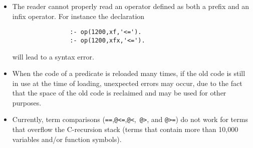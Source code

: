 \begin{itemize}
%
\item The reader cannot properly read an operator defined as both a
      prefix and an infix operator.  For instance the declaration 
      \begin{verbatim}
                :- op(1200,xf,'<=').
                :- op(1200,xfx,'<=').
      \end{verbatim}
      will lead to a syntax error.
%
\item When the code of a predicate is reloaded many times, if the old 
      code is still in use at the time of loading, unexpected errors may 
      occur, due to the fact that the space of the old code is reclaimed
      and may be used for other purposes.
\item Currently, term comparisons ({\tt ==},{\tt @<=},{\tt @<},{\tt
      @>}, and {\tt @>=}) do not work for terms that overflow the
      C-recursion stack (terms that contain more than 10,000 variables
      and/or function symbols).
\end{itemize}

